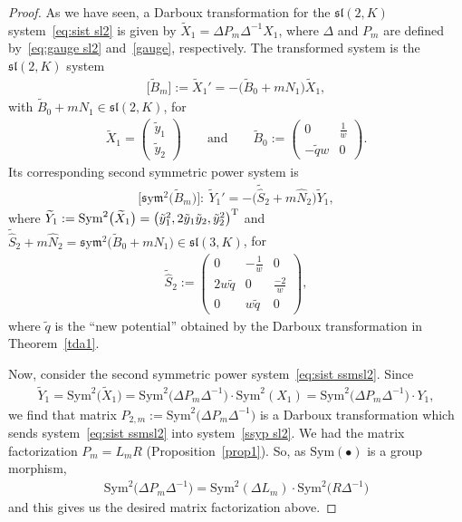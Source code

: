 \documentclass[10pt,a4paper]{amsart}
\numberwithin{equation}{section}
\def\Sym{\mathrm{Sym}}
\def\sym{\mathfrak{s}\mathrm{y}\mathfrak{m}}
\begin{document}
\begin{proof}
As we have seen, a Darboux transformation for the $\mathfrak{sl} (2,K)$ system~\eqref{eq:sist sl2} is given by $\widetilde{X}_1 = \Delta P_m \Delta^{-1} X_1$, where $\Delta$ and $P_m$ are defined by~\eqref{eq:gauge sl2} and~\eqref{gauge}, respectively. The transformed system is the $\mathfrak{sl} (2,K)$ system
\begin{gather*}%
 \big[\widetilde{B}_{m}\big]:= \widetilde{X}_{1}'=-\big(\widetilde{B}_0+mN_1\big) \widetilde{X}_{1},
\end{gather*}
with $\widetilde{B}_0+mN_1 \in \mathfrak{sl} (2,K)$, for
\begin{gather*}
\widetilde{X}_{1} = \begin{pmatrix} \tilde{y}_1 \\ \tilde{y}_2 \end{pmatrix} \qquad \text{and} \qquad
\widetilde{B}_0:= \begin{pmatrix} 0 & \frac1w \\ -\tilde{q} w & 0 \end{pmatrix}\!.
\end{gather*}
Its corresponding second symmetric power system is
\begin{gather}\label{ssyp sl2}
\big[\sym^2 \big(\widetilde{B}_m\big)\big]\colon\ \widetilde{Y}_1'=-\big(\widetilde{\widehat{S}}_2 + m \widehat{N}_2\big) \widetilde{Y}_1,
\end{gather}
where $ \widetilde{Y}_1:= \Sym^2 \big(\widetilde{X}_1\big) = \big( \tilde{y}_1^2, 2\tilde{y}_1\tilde{y}_2 , \tilde{y}_2^2 \big)^{\rm T}$
and $\widetilde{\widehat{S}}_2 + m \widehat{N}_2 =\sym^2 \big(\widetilde{B}_0+mN_1\big) \in \mathfrak{sl} (3,K)$, for
\begin{gather*}
\widetilde{\widehat{S}}_2:=\begin{pmatrix}
0&- \frac{1}{w}&0 \\ 2 w \tilde{q} &0& \frac{-2}{w} \\ 0&w \tilde{q}&0
\end{pmatrix}\!,
\end{gather*}
where $\tilde{q}$ is the ``new potential'' obtained by the Darboux transformation in Theorem~\ref{tda1}.

Now, consider the second symmetric power system~\eqref{eq:sist ssmsl2}. Since
\begin{gather*}
\widetilde{Y}_1 = \Sym^2 \big(\widetilde{X}_1\big) = \Sym^2 \big(\Delta P_m \Delta^{-1}\big) \cdot \Sym^2 ( X_1) = \Sym^2 \big(\Delta P_m \Delta^{-1}\big) \cdot Y_1,
\end{gather*}
we find that matrix $P_{2,m}:=\Sym^2 \big(\Delta P_m \Delta^{-1}\big)$
is a Darboux transformation which sends system~\eqref{eq:sist ssmsl2} into system~\eqref{ssyp sl2}.
We had the matrix factorization $P_m=L_m R$ (Proposition~\ref{prop1}). So,
as $\Sym(\bullet)$ is a group morphism,
\begin{gather*}
\Sym^2 \big(\Delta P_m \Delta^{-1} \big) = \Sym^2(\Delta L_m)\cdot \Sym^2\big(R \Delta^{-1}\big)
 \end{gather*}
and this gives us the desired matrix factorization above.
\end{proof}
\end{document}
